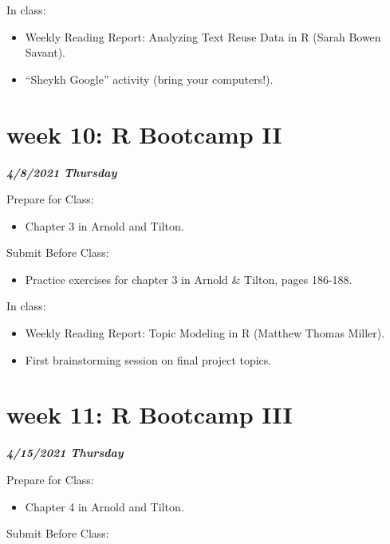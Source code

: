 \documentclass[
]{book}
\providecommand{\tightlist}{%
  \setlength{\itemsep}{0pt}\setlength{\parskip}{0pt}}
\begin{document}
In class:

\begin{itemize}
\tightlist
\item
  Weekly Reading Report: Analyzing Text Reuse Data in R (Sarah Bowen Savant).
\item
  ``Sheykh Google'' activity (bring your computers!).
\end{itemize}

\hypertarget{week-10-r-bootcamp-ii-1}{%
\chapter{week 10: R Bootcamp II}\label{week-10-r-bootcamp-ii-1}}

\textbf{\emph{4/8/2021 Thursday}}

Prepare for Class:

\begin{itemize}
\tightlist
\item
  Chapter 3 in Arnold and Tilton.
\end{itemize}

Submit Before Class:

\begin{itemize}
\tightlist
\item
  Practice exercises for chapter 3 in Arnold \& Tilton, pages 186-188.
\end{itemize}

In class:

\begin{itemize}
\tightlist
\item
  Weekly Reading Report: Topic Modeling in R (Matthew Thomas Miller).
\item
  First brainstorming session on final project topics.
\end{itemize}

\hypertarget{week-11-r-bootcamp-iii-1}{%
\chapter{week 11: R Bootcamp III}\label{week-11-r-bootcamp-iii-1}}

\textbf{\emph{4/15/2021 Thursday}}

Prepare for Class:

\begin{itemize}
\tightlist
\item
  Chapter 4 in Arnold and Tilton.
\end{itemize}

Submit Before Class:
\end{document}
